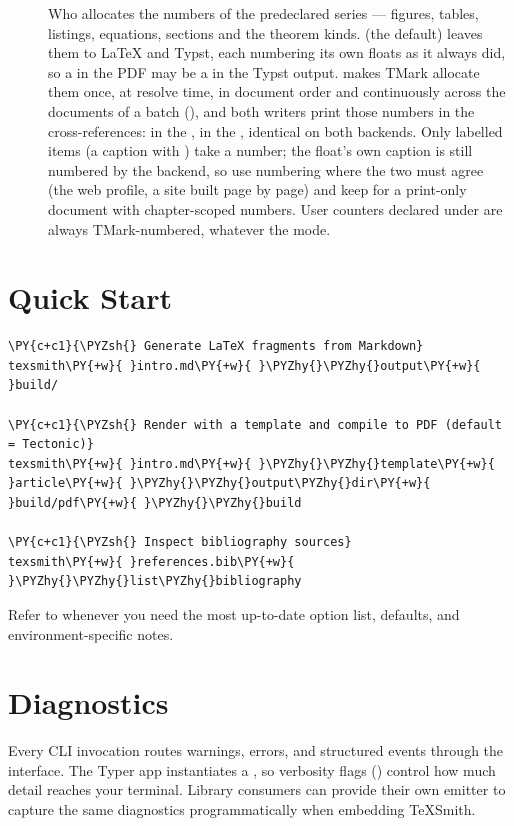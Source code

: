 \documentclass[a4paper,twoside]{article}
\begin{document}
\begin{description}
\item[{}] Who allocates the numbers of the predeclared series --- figures, tables, listings, equations, sections and the theorem kinds.  (the default) leaves them to \LaTeX{} and Typst, each numbering its own floats as it always did, so a  in the PDF may be a  in the Typst output.  makes TMark allocate them once, at resolve time, in document order and continuously across the documents of a batch (), and both writers print those numbers in the cross-references:  in the ,  in the , identical on both backends. Only labelled items (a caption with ) take a number; the float's own caption is still numbered by the backend, so use  numbering where the two must agree (the web profile, a site built page by page) and keep  for a print-only document with chapter-scoped numbers. User counters declared under  are always TMark-numbered, whatever the mode.
\end{description}
\section{Quick Start}
\begin{tscode}[lang=bash, engine=pygments]
\begin{Verbatim}[commandchars=\\\{\},breaklines, breakanywhere, commandchars=\\\{\}]
\PY{c+c1}{\PYZsh{} Generate LaTeX fragments from Markdown}
texsmith\PY{+w}{ }intro.md\PY{+w}{ }\PYZhy{}\PYZhy{}output\PY{+w}{ }build/

\PY{c+c1}{\PYZsh{} Render with a template and compile to PDF (default = Tectonic)}
texsmith\PY{+w}{ }intro.md\PY{+w}{ }\PYZhy{}\PYZhy{}template\PY{+w}{ }article\PY{+w}{ }\PYZhy{}\PYZhy{}output\PYZhy{}dir\PY{+w}{ }build/pdf\PY{+w}{ }\PYZhy{}\PYZhy{}build

\PY{c+c1}{\PYZsh{} Inspect bibliography sources}
texsmith\PY{+w}{ }references.bib\PY{+w}{ }\PYZhy{}\PYZhy{}list\PYZhy{}bibliography
\end{Verbatim}
\end{tscode}
Refer to  whenever you need the most up-to-date option list, defaults, and environment-specific notes.
\section{Diagnostics}
Every CLI invocation routes warnings, errors, and structured events through the  interface. The Typer app instantiates a , so verbosity flags () control how much detail reaches your terminal. Library consumers can provide their own emitter to capture the same diagnostics programmatically when embedding TeXSmith.
\end{document}
